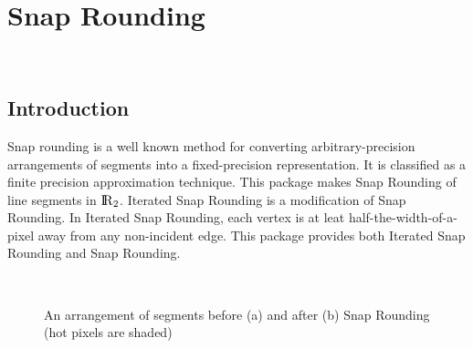 
\ccParDims


\chapter{Snap Rounding}
\label{chapterSnapRoundibg}
\\
\newcommand{\reals}{{\rm I\!\hspace{-0.025em} R}}
\def\A{{\cal A}}
\def\S{{\cal S}}

\section{Introduction}
Snap rounding is a well known method for converting
arbitrary-precision arrangements of segments into a fixed-precision
representation. It is classified as a finite precision approximation 
technique. This package makes Snap Rounding of line segments in $\reals_2$.
Iterated Snap Rounding is a modification of Snap Rounding. In
Iterated Snap Rounding,
each vertex is at leat half-the-width-of-a-pixel away from any non-incident
edge.
This package provides both Iterated Snap Rounding and Snap Rounding.

\begin{figure}
\begin{center}
\  \
\end{center}
\vspace{-2ex}
\caption{An arrangement of segments before (a) and after (b)
Snap Rounding (hot pixels are shaded)}
\label{fig:sr1}
\end{figure}


